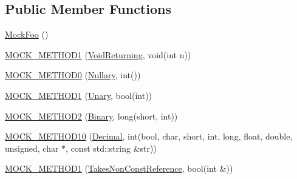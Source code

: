 \subsection*{Public Member Functions}
\begin{DoxyCompactItemize}
\item 
\mbox{\hyperlink{classtesting_1_1gmock__generated__function__mockers__test_1_1_mock_foo_a05d4aeb00d75b5dbf627a5db2c0ada7f}{Mock\+Foo}} ()
\item 
\mbox{\hyperlink{classtesting_1_1gmock__generated__function__mockers__test_1_1_mock_foo_a03e7f723e9909b031fc6df22f41aac7f}{M\+O\+C\+K\+\_\+\+M\+E\+T\+H\+O\+D1}} (\mbox{\hyperlink{classtesting_1_1gmock__generated__function__mockers__test_1_1_foo_interface_adf968115cf1260004d8abe372dc71c85}{Void\+Returning}}, void(int n))
\item 
\mbox{\hyperlink{classtesting_1_1gmock__generated__function__mockers__test_1_1_mock_foo_a25b99ec3b994318b7ecb0578da113136}{M\+O\+C\+K\+\_\+\+M\+E\+T\+H\+O\+D0}} (\mbox{\hyperlink{classtesting_1_1gmock__generated__function__mockers__test_1_1_foo_interface_a633e753eafa7f82dde22ecf9492f341c}{Nullary}}, int())
\item 
\mbox{\hyperlink{classtesting_1_1gmock__generated__function__mockers__test_1_1_mock_foo_a9f9ce709a5b13e319eeb348e6eae3d18}{M\+O\+C\+K\+\_\+\+M\+E\+T\+H\+O\+D1}} (\mbox{\hyperlink{classtesting_1_1gmock__generated__function__mockers__test_1_1_foo_interface_ae0885ac29bc4a3f180f6573d8b1a341e}{Unary}}, bool(int))
\item 
\mbox{\hyperlink{classtesting_1_1gmock__generated__function__mockers__test_1_1_mock_foo_a50f8c94d6fab258d49e1d4a15ea7a7af}{M\+O\+C\+K\+\_\+\+M\+E\+T\+H\+O\+D2}} (\mbox{\hyperlink{classtesting_1_1gmock__generated__function__mockers__test_1_1_foo_interface_a59ea28b711ece054ce9d57c2dc574ba0}{Binary}}, long(short, int))
\item 
\mbox{\hyperlink{classtesting_1_1gmock__generated__function__mockers__test_1_1_mock_foo_ab0a37a844eb43c36ca45cff5274bd9e9}{M\+O\+C\+K\+\_\+\+M\+E\+T\+H\+O\+D10}} (\mbox{\hyperlink{classtesting_1_1gmock__generated__function__mockers__test_1_1_foo_interface_a5a389017205848c7b7055c071cca0c6d}{Decimal}}, int(bool, char, short, int, long, float, double, unsigned, char $\ast$, const std\+::string \&str))
\item 
\mbox{\hyperlink{classtesting_1_1gmock__generated__function__mockers__test_1_1_mock_foo_a785cbef820189a974170cea52b0d97d9}{M\+O\+C\+K\+\_\+\+M\+E\+T\+H\+O\+D1}} (\mbox{\hyperlink{classtesting_1_1gmock__generated__function__mockers__test_1_1_foo_interface_a694354adfffcee58093298bc12182ff5}{Takes\+Non\+Const\+Reference}}, bool(int \&))

\end{DoxyCompactItemize}
